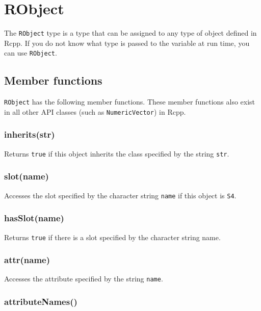 \documentclass[]{book}
\begin{document}
\hypertarget{robject}{%
\chapter{RObject}\label{robject}}

The \texttt{RObject} type is a type that can be assigned to any type of object defined in Rcpp. If you do not know what type is passed to the variable at run time, you can use \texttt{RObject}.

\hypertarget{member-functions-7}{%
\section{Member functions}\label{member-functions-7}}

\texttt{RObject} has the following member functions. These member functions also exist in all other API classes (such as \texttt{NumericVector}) in Rcpp.

\hypertarget{inheritsstr-1}{%
\subsection{inherits(str)}\label{inheritsstr-1}}

Returns \texttt{true} if this object inherits the class specified by the string \texttt{str}.

\hypertarget{slotname}{%
\subsection{slot(name)}\label{slotname}}

Accesses the slot specified by the character string \texttt{name} if this object is \texttt{S4}.

\hypertarget{hasslotname}{%
\subsection{hasSlot(name)}\label{hasslotname}}

Returns \texttt{true} if there is a slot specified by the character string name.

\hypertarget{attrname}{%
\subsection{attr(name)}\label{attrname}}

Accesses the attribute specified by the string \texttt{name}.

\hypertarget{attributenames}{%
\subsection{attributeNames()}\label{attributenames}}
\end{document}
